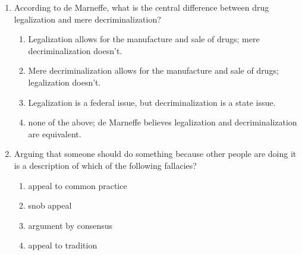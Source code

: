 \documentclass[12pt]{article}
\begin{document}
\begin{enumerate}[label=\arabic*.]
\begin{enumerate}[label=(\alph*)]
    \item we allow the patient to harm him- or herself.
    \item we force doctors to harm the patient.
    \item we harm the patient's family.
    \item we harm the patient.
\end{enumerate}
\item According to de Marneffe, what is the central difference between drug legalization and mere decriminalization?
\begin{enumerate}[label=(\alph*)]
    \item Legalization allows for the manufacture and sale of drugs; mere decriminalization doesn't.
    \item Mere decriminalization allows for the manufacture and sale of drugs; legalization doesn't.
    \item Legalization is a federal issue, but decriminalization is a state issue.
    \item none of the above; de Marneffe believes legalization and decriminalization are equivalent.
\end{enumerate}
\item Arguing that someone should do something because other people are doing it is a description of which of the following fallacies?
\begin{enumerate}[label=(\alph*)]
    \item appeal to common practice
    \item snob appeal
    \item argument by consensus
    \item appeal to tradition
\end{enumerate}
\end{enumerate}
\end{document}

